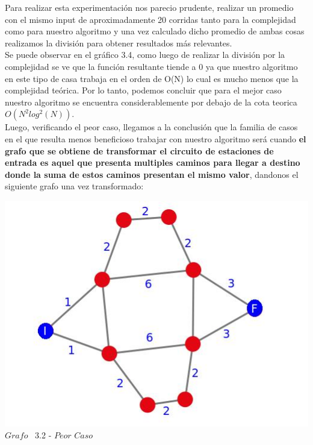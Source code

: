 Para realizar esta experimentaci\'on nos parecio prudente, realizar un promedio con el mismo input de aproximadamente 20 corridas
tanto para la complejidad como para nuestro algoritmo y una vez calculado dicho promedio de ambas cosas realizamos la divisi\'on para
obtener resultados m\'as relevantes.\\ 

Se puede observar en el gr\'afico 3.4, como luego de realizar la divisi\'on por la complejidad se ve que la funci\'on resultante tiende a 0 ya que nuestro algoritmo en este tipo de casa trabaja en el orden de O(N) lo cual es mucho menos que la complejidad te\'orica. Por lo tanto, podemos concluir que para el mejor caso nuestro algoritmo se encuentra considerablemente por debajo de la cota teorica $O(N^2 log^2(N))$.\\

Luego, verificando el peor caso, llegamos a la conclusi\'on que la familia de casos en el que resulta menos beneficioso trabajar con nuestro algoritmo ser\'a cuando \textbf{el grafo que se obtiene de transformar el circuito de estaciones de entrada es aquel que presenta multiples caminos para llegar a destino donde la suma de estos caminos presentan el mismo valor}, dandonos el siguiente grafo una vez transformado:\\


\vspace*{0.3cm} \vspace*{0.3cm}
  \begin{center}
 \includegraphics[scale=0.5]{./EJ3/grafoMultiCamino.jpeg}
 \\{$Grafo$ \ 3.2 - $Peor$ $Caso$}
  \end{center}
  \vspace*{0.3cm}
  

